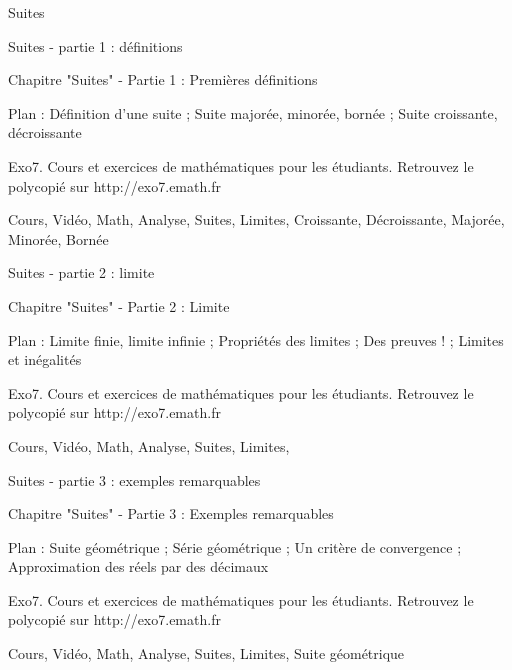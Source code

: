 
   Suites

Suites - partie 1 : définitions



Chapitre "Suites" - Partie 1 : Premières définitions

Plan : Définition d'une suite ; Suite majorée, minorée, bornée ; Suite croissante, décroissante

Exo7. Cours et exercices de mathématiques pour les étudiants.
Retrouvez le polycopié sur http://exo7.emath.fr


Cours, Vidéo, Math, Analyse, Suites, Limites, Croissante, Décroissante, Majorée, Minorée, Bornée


Suites - partie 2 : limite



Chapitre "Suites" - Partie 2 : Limite

Plan : Limite finie, limite infinie ; Propriétés des limites ; Des preuves ! ; Limites et inégalités

Exo7. Cours et exercices de mathématiques pour les étudiants.
Retrouvez le polycopié sur http://exo7.emath.fr


Cours, Vidéo, Math, Analyse, Suites, Limites, 



Suites - partie 3 : exemples remarquables



Chapitre "Suites" - Partie 3 : Exemples remarquables

Plan : Suite géométrique ; Série géométrique ; Un critère de convergence ;
Approximation des réels par des décimaux

Exo7. Cours et exercices de mathématiques pour les étudiants.
Retrouvez le polycopié sur http://exo7.emath.fr


Cours, Vidéo, Math, Analyse, Suites, Limites, Suite géométrique



